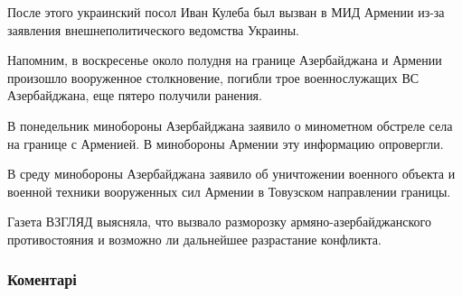 После этого украинский посол Иван Кулеба был вызван в МИД Армении из-за
заявления внешнеполитического ведомства Украины.

Напомним, в воскресенье около полудня на границе Азербайджана и Армении
произошло вооруженное столкновение, погибли трое военнослужащих ВС
Азербайджана, еще пятеро получили ранения.

В понедельник минобороны Азербайджана заявило о минометном обстреле села на
границе с Арменией. В минобороны Армении эту информацию опровергли.

В среду минобороны Азербайджана заявило об уничтожении военного объекта и
военной техники вооруженных сил Армении в Товузском направлении границы. 

Газета ВЗГЛЯД выясняла, что
вызвало разморозку армяно-азербайджанского противостояния и возможно ли
дальнейшее разрастание конфликта.


\subsubsection{Коментарі}

